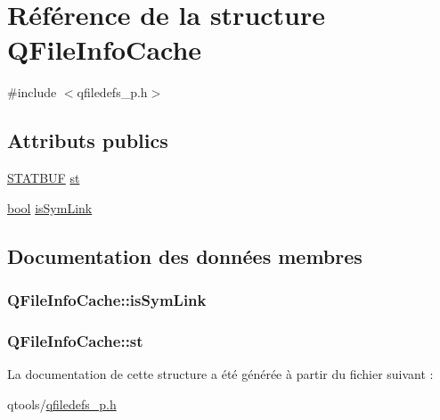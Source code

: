 \hypertarget{struct_q_file_info_cache}{}\section{Référence de la structure Q\+File\+Info\+Cache}
\label{struct_q_file_info_cache}


{\ttfamily \#include $<$qfiledefs\+\_\+p.\+h$>$}

\subsection*{Attributs publics}
\begin{DoxyCompactItemize}
\item 
\hyperlink{qfiledefs__p_8h_acea9c312904e992f2f1a5570e7f2a270}{S\+T\+A\+T\+B\+U\+F} \hyperlink{struct_q_file_info_cache_a3afe0efbdb42e24dcbacd5742cc607bd}{st}
\item 
\hyperlink{qglobal_8h_a1062901a7428fdd9c7f180f5e01ea056}{bool} \hyperlink{struct_q_file_info_cache_ab879a63d2c3f07aaffafabdd3731539a}{is\+Sym\+Link}
\end{DoxyCompactItemize}


\subsection{Documentation des données membres}
\hypertarget{struct_q_file_info_cache_ab879a63d2c3f07aaffafabdd3731539a}{}
\subsubsection[{is\+Sym\+Link}]{ Q\+File\+Info\+Cache\+::is\+Sym\+Link}\label{struct_q_file_info_cache_ab879a63d2c3f07aaffafabdd3731539a}
\hypertarget{struct_q_file_info_cache_a3afe0efbdb42e24dcbacd5742cc607bd}{}
\subsubsection[{st}]{ Q\+File\+Info\+Cache\+::st}\label{struct_q_file_info_cache_a3afe0efbdb42e24dcbacd5742cc607bd}


La documentation de cette structure a été générée à partir du fichier suivant \+:\begin{DoxyCompactItemize}
\item 
qtools/\hyperlink{qfiledefs__p_8h}{qfiledefs\+\_\+p.\+h}\end{DoxyCompactItemize}
